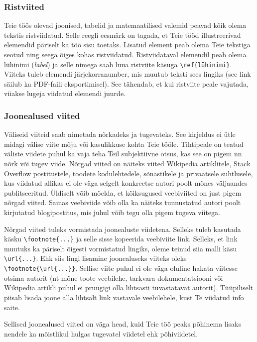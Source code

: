 \subsubsection{Ristviited}
Teie töös olevad joonised, tabelid ja matemaatilised valemid peavad kõik olema tekstis ristviidatud. Selle reegli eesmärk on tagada, et Teie tööd illustreerivad elemendid päriselt ka töö sisu toetaks. Lisatud element peab olema Teie tekstiga seotud ning seega õiges kohas ristviidatud. Ristviidataval elemendil peab olema lühinimi (\emph{label}) ja selle nimega saab luua ristviite käsuga \verb|\ref{lühinimi}|. Viiteks tuleb elemendi järjekorranumber, mis muutub teksti sees lingiks (see link säilub ka PDF-faili eksportimisel). See tähendab, et kui ristviite peale vajutada, viiakse lugeja viidatud elemendi juurde.

\subsubsection{Joonealused viited}
Väliseid viiteid saab nimetada nõrkadeks ja tugevateks. See kirjeldus ei ütle midagi välise viite mõju või kasulikkuse kohta Teie tööle. Tihtipeale on teatud väliste viidete puhul ka vaja teha Teil subjektiivne otsus, kas see on pigem nn nõrk või tugev viide. Nõrgad viited on näiteks viited Wikipedia artiklitele, Stack Overflow postitustele, toodete kodulehtedele, sõnastikele ja privaatsele suhtlusele, kus viidatud allikas ei ole väga selgelt konkreetse autori poolt mõnes väljaandes publitseeritud. Üldiselt võib mõelda, et kõiksugused veebiviited on just pigem nõrgad viited. Samas veebiviide võib olla ka näiteks tunnustatud autori poolt kirjutatud blogipostitus, mis juhul võib tegu olla pigem tugeva viitega.

Nõrgad viited tuleks vormistada joonealuste viidetena. Selleks tuleb kasutada käsku \verb|\footnote{...}| ja selle sisse kopeerida veebiviite link. Selleks, et link muutuks ka päriselt õigesti vormistatud lingiks, oleme teinud siia malli käsu \verb|\url{...}|. Ehk siis lingi lisamine joonealuseks viiteks oleks \verb|\footnote{\url{...}}|. Sellise viite puhul ei ole väga oluline hakata viitesse otsima autorit (nt mõne toote veebilehe, tarkvara dokumentatsiooni või Wikipedia artikli puhul ei pruugigi olla lihtsasti tuvastatavat autorit). Tüüpiliselt piisab lisada joone alla lihtsalt link vastavale veebilehele, kust Te viidatud info saite.

Sellised joonealused viited on väga head, kuid Teie töö peaks põhinema lisaks nendele ka mõistlikul hulgas tugevatel viidetel ehk põhiviidetel.

